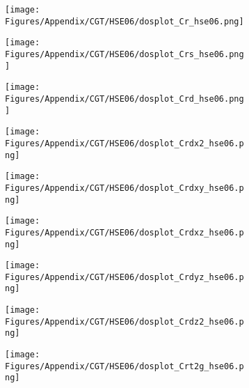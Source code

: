 \newpage
 \begin{figure}[H]
      \centering
    \begin{subfigure}{0.24\textwidth}
    \texttt{[image: Figures/Appendix/CGT/HSE06/dosplot\_Cr\_hse06.png]}
    \label{dosplot_Cr_hse06}   
    \end{subfigure}  
    \hfill
\begin{subfigure}{0.24\textwidth}
\centering
    \texttt{[image: Figures/Appendix/CGT/HSE06/dosplot\_Crs\_hse06.png]}
    \label{dosplot_Crs_hse06}
\end{subfigure}
\hfill
\begin{subfigure}{0.24\textwidth}
    \texttt{[image: Figures/Appendix/CGT/HSE06/dosplot\_Crd\_hse06.png]}
    \label{dosplot_Crd_hse06}
\end{subfigure}
\hfill
\begin{subfigure}{0.24\textwidth}
    \texttt{[image: Figures/Appendix/CGT/HSE06/dosplot\_Crdx2\_hse06.png]}
    \label{dodosplot_Crdx2_hse06}
\end{subfigure}
\hfill
\begin{subfigure}{0.24\textwidth}
    \texttt{[image: Figures/Appendix/CGT/HSE06/dosplot\_Crdxy\_hse06.png]}
    \label{dosplot_Crdxy_hse06}
\end{subfigure}
\hfill
\begin{subfigure}{0.24\textwidth}
    \texttt{[image: Figures/Appendix/CGT/HSE06/dosplot\_Crdxz\_hse06.png]}
    \label{dosplot_Crdxz_hse06}
\end{subfigure}
\hfill
\begin{subfigure}{0.24\textwidth}
    \texttt{[image: Figures/Appendix/CGT/HSE06/dosplot\_Crdyz\_hse06.png]}
    \label{dosplot_Crdyz_hse06}
\end{subfigure}
\hfill
\begin{subfigure}{0.24\textwidth}
    \texttt{[image: Figures/Appendix/CGT/HSE06/dosplot\_Crdz2\_hse06.png]}
    \label{dosplot_Crdz2_hse06}
\end{subfigure}
\hfill
\begin{subfigure}{0.24\textwidth}
    \texttt{[image: Figures/Appendix/CGT/HSE06/dosplot\_Crt2g\_hse06.png]}
    \label{dosplot_Crt2g_hse06}
\end{subfigure}
\hfill
\begin{subfigure}{0.24\textwidth}

\end{subfigure}
\end{figure}
